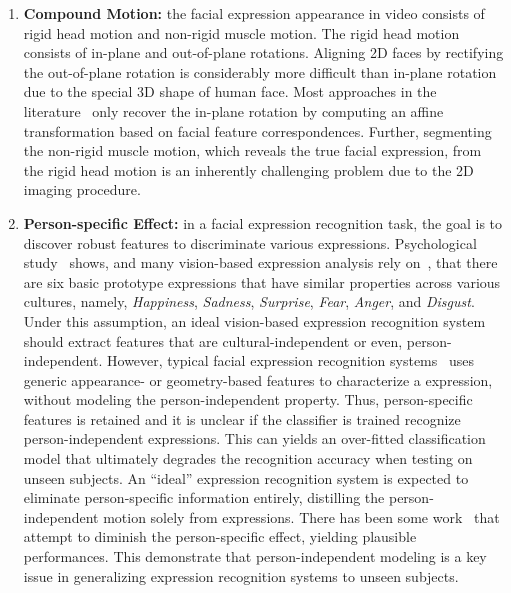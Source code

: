 \documentclass[journal]{IEEEtran}
\begin{document}
\begin{enumerate}

\item \textbf{Compound Motion:} the facial expression appearance in video consists of rigid head motion and non-rigid muscle motion. The rigid head motion consists of in-plane and out-of-plane rotations. Aligning 2D faces by rectifying the out-of-plane rotation is considerably more difficult than in-plane rotation due to the special 3D shape of human face. Most approaches in the literature~\cite{Bartlett_FG11}\cite{Valstar_FERA11} only recover the in-plane rotation by computing an affine transformation based on facial feature correspondences. Further, segmenting the non-rigid muscle motion, which reveals the true facial expression, from the rigid head motion is an inherently challenging problem due to the 2D imaging procedure.

\item \textbf{Person-specific Effect:} in a facial expression recognition task, the goal is to discover robust features to discriminate various expressions. Psychological study~\cite{Fridlund_87} shows, and many vision-based expression analysis rely on~\cite{Pantic_PAMI00}, that there are six basic prototype expressions that have similar properties across various cultures, namely, \textit{Happiness}, \textit{Sadness}, \textit{Surprise}, \textit{Fear}, \textit{Anger}, and \textit{Disgust}. Under this assumption, an ideal vision-based expression recognition system should extract features that are cultural-independent or even, person-independent. However, typical facial expression recognition systems~\cite{Bartlett_FG11}\cite{Valstar_SMCB12} uses generic appearance- or geometry-based features to characterize a expression, without modeling the person-independent property. Thus, person-specific features is retained and it is unclear if the classifier is trained recognize person-independent expressions. This can yields an over-fitted classification model that ultimately degrades the recognition accuracy when testing on unseen subjects. An ``ideal'' expression recognition system is expected to eliminate person-specific information entirely, distilling the person-independent motion solely from expressions. There has been some work~\cite{Yang_SMCB12}\cite{Dahmane_TMM14} that attempt to diminish the person-specific effect, yielding plausible performances. This demonstrate that person-independent modeling is a key issue in generalizing expression recognition systems to unseen subjects.

\end{enumerate}
\end{document}
